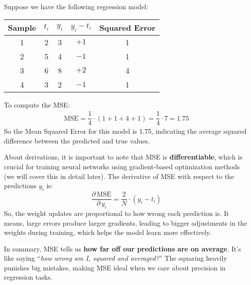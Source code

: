 \begin{deepeningbox}
    \begin{examplebox}\label{ex:mse-calculation}
        Suppose we have the following regression model:
        \begin{center}
            \begin{tabular}{@{} c | c | c | c | c @{}}
                \toprule
                Sample & $t_i$ & $y_i$ & $y_i - t_i$ & Squared Error \\
                \midrule
                1   & 2 & 3 & $+1$  & 1 \\[.3em]
                2   & 5 & 4 & $-1$  & 1 \\[.3em]
                3   & 6 & 8 & $+2$  & 4 \\[.3em]
                4   & 3 & 2 & $-1$  & 1 \\
                \bottomrule
            \end{tabular}
        \end{center}

        To compute the MSE:
        \begin{align*}
            \text{MSE} = \dfrac{1}{4} \cdot \left(1 + 1 + 4 + 1\right) = \dfrac{1}{4} \cdot 7 = 1.75
        \end{align*}
        So the Mean Squared Error for this model is 1.75, indicating the average squared difference between the predicted and true values.
    \end{examplebox}

    About derivations, it is important to note that MSE is \textbf{differentiable}, which is crucial for training neural networks using gradient-based optimization methods (we will cover this in detail later). The derivative of MSE with respect to the predictions $y_i$ is:
    \begin{equation}
        \dfrac{\partial \, \text{MSE}}{\partial \, y_i} = \dfrac{2}{N} \cdot \left(y_i - t_i\right)
    \end{equation}
    So, the weight updates are proportional to how wrong each prediction is. It means, large errors produce larger gradients, leading to bigger adjustments in the weights during training, which helps the model learn more effectively.

    \highspace
    In summary, MSE tells us \textbf{how far off our predictions are on average}. It's like saying ``\emph{how wrong am I, squared and averaged?}'' The squaring heavily punishes big mistakes, making MSE ideal when we care about precision in regression tasks.
\end{deepeningbox}

